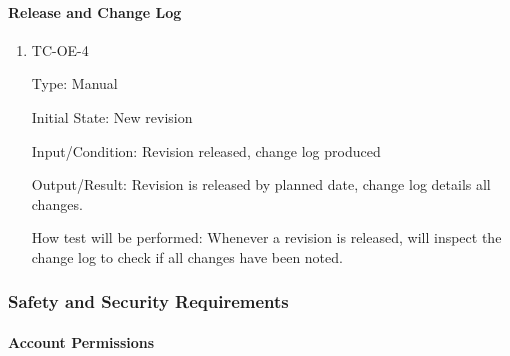 \documentclass[12pt, titlepage]{article}
\begin{document}
\paragraph{Release and Change Log}

\begin{enumerate}

  \item{TC-OE-4\\}

    Type: Manual

    Initial State: New revision

    Input/Condition: Revision released, change log produced

    Output/Result: Revision is released by planned date, change log
    details all changes.

    How test will be performed: Whenever a revision is released, will
    inspect the change log to check if all changes have been noted.

\end{enumerate}

\subsubsection{Safety and Security Requirements}

\paragraph{Account Permissions}
\end{document}
